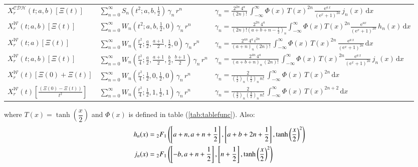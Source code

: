 \documentclass[a4paper,11pt,twoside]{amsart}
\newcommand{\defeq}{=}
\newcommand{\defeq}{\stackrel{\scriptscriptstyle \textnormal{def}}{=}}
\begin{document}
\begin{footnotesize}
\begin{table}[H]
\begin{center}
\begin{tabular}{|l|l|l|}
      $X^\mathcal{CDH}_r(t;a,b)\left[\Xi(t)\right]$ & $\displaystyle \sum_{n=0}^\infty S_{n}\left(t^2;a,b,\frac12\right)\,\gamma_n\,r^{n}$  &$\displaystyle\gamma_n=\frac{2^{2n}\,4^a}{(2n)!}\,\int_{-\infty}^{\infty} \Phi(x)\,T(x)^{2n}\,\frac{\textrm{e}^{a\,x}}{(\textrm{e}^x+1)^{2a}}\, j_n(x)\,\mathrm{d}x$ \\
      $X^\mathcal{W}_r(t;a,b)\left[\Xi(t)\right]$ & $\displaystyle \sum_{n=0}^\infty W_n\left(t^2;a,b,\frac12,0\right)\,\gamma_n\,r^n$  &$\displaystyle\gamma_n=\frac{2^{2n}\,4^a}{(2n)!\left(a+b+n-\frac12\right)_n}\int_{-\infty}^{\infty} \Phi(x)T(x)^{2n}\frac{\mathrm{e}^{ax}}{(\mathrm{e}^x+1)^{2a}}\,h_n(x)\,\mathrm{d}x$ \\ 
      $X^\mathcal{W}_r(t;a)\left[\Xi(t)\right]$ & $\displaystyle \sum_{n=0}^\infty W_{n}\left(\frac{t^2}{4};\frac{a}{2},\frac{a+1}{2},\frac12,0\right)\,\gamma_n\,r^{n}$  &$\displaystyle\gamma_n=\frac{2^{4n}\,4^a\,i^{2n}\,}{\left(a+n\right)_{n}\,(2n)!}\,\int_{-\infty}^{\infty} \Phi(x)\,T(x)^{2n}\,\frac{\textrm{e}^{a\,x}}{(\textrm{e}^x+1)^{2a}}\,\mathrm{d}x$ \\  
      $X^\mathcal{W}_r(t;a,b)\left[\Xi(t)\right]$ & $\displaystyle \sum_{n=0}^\infty W_{n}\left(\frac{t^2}{4};\frac{a}{2},\frac{a+1}{2},\frac{b}{2},\frac{b+1}{2}\right)\,\gamma_n\,r^{n}$  &$\displaystyle\gamma_n=\frac{2^{4n}\,4^a}{\left(a+b+n\right)_n\,(2n)!}\,\int_{-\infty}^{\infty} \Phi(x)\,T(x)^{2n}\frac{\textrm{e}^{a\,x}}{(\textrm{e}^x+1)^{2a}}\,j_n(x)\,\mathrm{d}x$ \\  
      $X^\mathcal{W}_r(t)\left[\Xi(0)+\Xi(t)\right]$ & $\displaystyle \sum_{n=0}^\infty W_n\left(\frac{t^2}{4};\frac12,0,\frac12,0\right)\,\gamma_n\,r^n$  &$\displaystyle\gamma_n=\frac{2}{\left(\frac12\right)_n\left(\frac12\right)_n\,n!}\,\int_{-\infty}^\infty \Phi(x)\,T(x)^{2n}\, \mathrm{d}x$ \\  
      $X^\mathcal{W}_r(t)\left[\frac{(\Xi(0)-\Xi(t))}{t^2}\right]$ & $\displaystyle \sum_{n=0}^\infty W_n\left(\frac{t^2}{4};\frac12,1,\frac12,1\right)\,\gamma_n\,r^n$  &$\displaystyle\gamma_n=\frac{2}{\left(\frac32\right)_n\left(\frac32\right)_n\,n!}\,\int_{-\infty}^\infty \Phi(x)\,T(x)^{2n+2}\, \mathrm{d}x$ \\        
    \end{tabular}
  \end{center}
\end{table}
where $T(x) = \tanh\left(\dfrac{x}{2}\right)$ and $\Phi(x)$ is defined in table (\ref{tab:tablefunc}). Also:
\begin{align}
 h_n(x) &\defeq {}_2F_1\left(\left[a+n, a+n+\frac12\right],\left[a+b+2n+\frac12\right],\tanh\left(\frac{x}{2}\right)^2\right) \notag \\
 j_n(x) &\defeq {}_2F_1\left(\left[-b, a+n+\frac12\right],\left[n+\frac12\right],\tanh\left(\frac{x}{2}\right)^2\right) \notag \notag
\end{align} 
\end{footnotesize}
\end{document}
